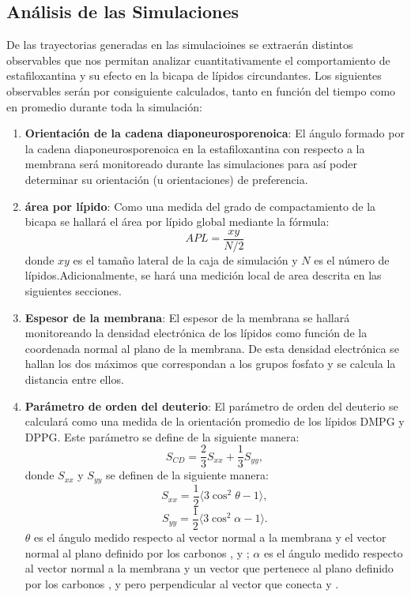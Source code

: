 \subsection*{An\'{a}lisis de las Simulaciones}
De las trayectorias generadas en las simulacioines se extraer\'{a}n distintos observables que nos permitan analizar cuantitativamente el comportamiento de estafiloxantina y su efecto en la bicapa de l\'{i}pidos circundantes. Los siguientes observables ser\'{a}n por consiguiente calculados, tanto en funci\'{o}n del tiempo como en promedio durante toda la simulaci\'{o}n:\\
\begin{enumerate}
\item \textbf{Orientaci\'{o}n de la cadena diaponeurosporenoica}: El \'{a}ngulo formado por la cadena diaponeurosporenoica en la estafiloxantina con respecto a la membrana ser\'{a} monitoreado durante las simulaciones para as\'{i} poder determinar su orientaci\'{o}n (u orientaciones) de preferencia.
\item \textbf{\'{a}rea por l\'{i}pido}: Como una medida del grado de compactamiento de la bicapa se hallar\'{a} el \'{a}rea por l\'{i}pido global mediante la f\'{o}rmula:
\begin{equation}
APL=\frac{xy}{N/2}
\end{equation}
donde $xy$ es el tama\~no lateral de la caja de simulaci\'{o}n y $N$ es el n\'{u}mero de l\'{i}pidos.Adicionalmente, se har\'{a} una medici\'{o}n local de area descrita en las siguientes secciones.
\item \textbf{Espesor de la membrana}:
El espesor de la membrana se hallar\'{a} monitoreando la densidad electr\'{o}nica de los l\'{i}pidos como funci\'{o}n de la coordenada normal al plano de la membrana. De esta densidad electr\'{o}nica se hallan los dos m\'{a}ximos que correspondan a los grupos fosfato y se calcula la distancia entre ellos.
\item  \textbf{Par\'{a}metro de orden del deuterio}:
El par\'{a}metro de orden del deuterio se calcular\'{a} como una medida de la orientaci\'{o}n promedio de los l\'{i}pidos DMPG y DPPG. Este par\'{a}metro se define de la siguiente manera: \cite{Aponte-santamariaSupplementaryFigures}\\
\begin{equation}
S_{CD}=\frac{2}{3}S_{xx}+\frac{1}{3}S_{yy},
 \end{equation}
donde $S_{xx}$ y $S_{yy}$ se definen de la siguiente manera:
\begin{equation}
S_{xx}=\frac{1}{2}\langle 3\cos^2\theta-1\rangle,
 \end{equation}
\begin{equation}
S_{yy}=\frac{1}{2}\langle 3\cos^2\alpha-1\rangle.
 \end{equation}
$\theta$ es el \'{a}ngulo medido respecto al vector normal a la membrana y el vector normal al plano definido por los carbonos ,  y ; $\alpha$ es el \'{a}ngulo medido respecto al vector normal a la membrana y un vector que pertenece al plano definido por los carbonos ,  y  pero perpendicular al vector que conecta   y .


\end{enumerate}

